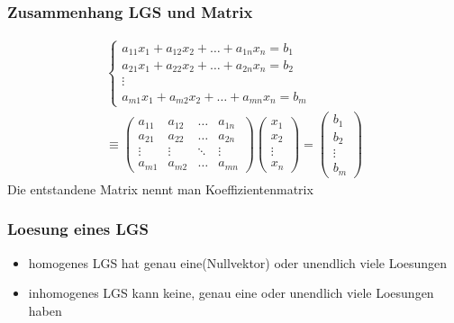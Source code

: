 \begin{frame}
    \frametitle{Zusammenhang LGS und Matrix}
    \begin{multline}
        \begin{cases}
            a_{11}x_1 + a_{12}x_2 + \dots + a_{1n}x_n = b_1 \\
            a_{21}x_1 + a_{22}x_2 + \dots + a_{2n}x_n = b_2 \\
            \vdots \\
            a_{m1}x_1 + a_{m2}x_2 + \dots + a_{mn}x_n = b_m
        \end{cases}
        \\ \equiv
        \begin{pmatrix}
            a_{11} & a_{12} & \dots  & a_{1n} \\
            a_{21} & a_{22} & \dots  & a_{2n} \\
            \vdots & \vdots & \ddots & \vdots \\
            a_{m1} & a_{m2} & \dots  & a_{mn}
        \end{pmatrix}
        \begin{pmatrix}
            x_1    \\
            x_2    \\
            \vdots \\
            x_n
        \end{pmatrix}
        =
        \begin{pmatrix}
            b_1    \\
            b_2    \\
            \vdots \\
            b_m
        \end{pmatrix}
    \end{multline}
    Die entstandene Matrix nennt man Koeffizientenmatrix
\end{frame}

\begin{frame}
    \frametitle{Loesung eines LGS}
    \begin{itemize}
        \item homogenes LGS hat genau eine(Nullvektor) oder unendlich viele Loesungen
        \item inhomogenes LGS kann keine, genau eine oder unendlich viele Loesungen haben
    \end{itemize}
\end{frame}


